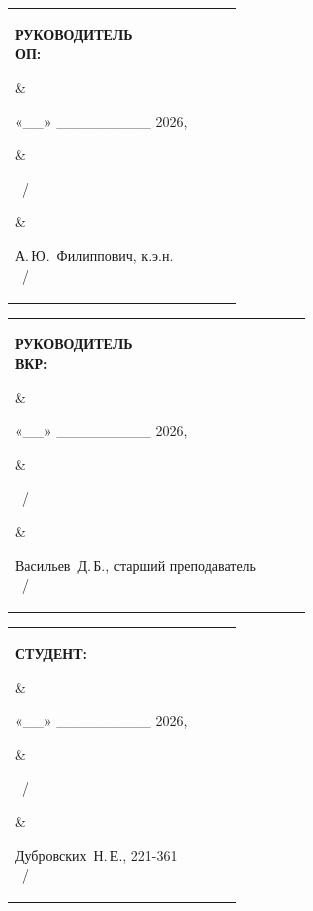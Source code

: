 \vspace{5pt}

\footnotesize
\newcommand{\assignmentdaterow}{«\_\_» \_\_\_\_\_\_\_\_\_ 2026,}
\newcommand{\assignmentsignaturebox}{\makebox[24mm][l]{\hrulefill}\ /}
\newcommand{\assignmentnamebox}[1]{%
  \parbox[c][12mm][c]{57mm}{\centering
    #1\\[-0.35ex]
    \makebox[53mm][l]{\hrulefill}\ /
  }%
}
\newcommand{\assignmentsignrow}[3]{%
  \noindent
  \begin{tabular*}{\textwidth}{@{}p{36mm}@{\hspace{2mm}}p{36mm}@{\hspace{2mm}}p{28mm}@{\hspace{2mm}}p{57mm}@{}}
  \parbox[c][12mm][c]{36mm}{\raggedright\textbf{#1}} &
  \parbox[c][12mm][c]{36mm}{\centering\assignmentdaterow} &
  \parbox[c][12mm][c]{28mm}{\centering\assignmentsignaturebox} &
  \assignmentnamebox{#2} \\
  & &
  \parbox[t]{28mm}{\centering\scriptsize подпись} &
  \parbox[t]{57mm}{\centering\scriptsize #3}
  \end{tabular*}\par
}

\assignmentsignrow{РУКОВОДИТЕЛЬ\\ОП:}{А.\,Ю.~Филиппович, к.э.н.}{ФИО, уч. звание и степень}
\vspace{4pt}
\assignmentsignrow{РУКОВОДИТЕЛЬ\\ВКР:}{Васильев~Д.\,Б., старший преподаватель}{ФИО, уч. звание и степень}
\vspace{4pt}
\assignmentsignrow{СТУДЕНТ:}{Дубровских~Н.\,Е., 221-361}{ФИО, группа}

\clearpage
\endgroup
